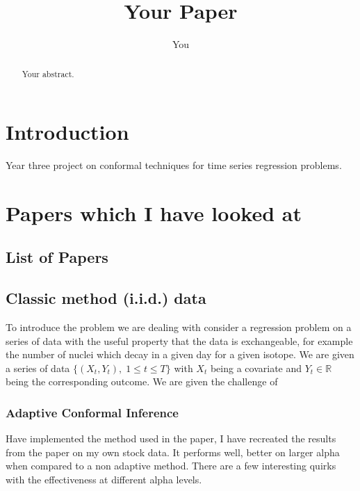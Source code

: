 \documentclass{article}
\title{Your Paper}
\author{You}
\begin{document}
\maketitle

\begin{abstract}
Your abstract.
\end{abstract}

\section{Introduction}
Year three project on conformal techniques for time series regression problems.




\section{Papers which I have looked at}

\subsection{List of Papers}


\subsection{Classic method (i.i.d.) data}
To introduce the problem we are dealing with consider a regression problem on a series of data with the useful property that the data is exchangeable, for example the number of nuclei which decay in a given day for a given isotope. We are given a series of data $\{(X_t, Y_t), \; 1\leq t \leq T\}$ with $X_t$ being a covariate and $Y_t \in \mathbb{R}$ being the corresponding outcome.
We are given the challenge of 










\subsubsection{Adaptive Conformal Inference}
\cite{gibbs2021adaptive}

Have implemented the method used in the paper, I have recreated the results from the paper on my own stock data. It performs well, better on larger alpha when compared to a non adaptive method. There are a few interesting quirks with the effectiveness at different alpha levels. 
\end{document}
